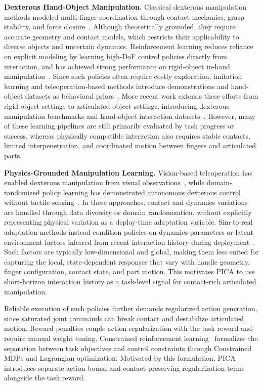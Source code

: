 \documentclass{llmxive}
\begin{document}
\textbf{Dexterous Hand-Object Manipulation.}
Classical dexterous manipulation methods modeled multi-finger coordination through contact mechanics, grasp stability, and force closure~\cite{bicchi1995closure,okamura2000overview}. Although theoretically grounded, they require accurate geometry and contact models, which restricts their applicability to diverse objects and uncertain dynamics. Reinforcement learning reduces reliance on explicit modeling by learning high-DoF control policies directly from interaction, and has achieved strong performance on rigid-object in-hand manipulation~\cite{andrychowicz2020learning,rajeswaran2018learning,chen2021system}. Since such policies often require costly exploration, imitation learning and teleoperation-based methods introduce demonstrations and hand-object datasets as behavioral priors~\cite{qin2022dexmv,yang2022oakink,qin2023anyteleop,liu2022hoi4d}. More recent work extends these efforts from rigid-object settings to articulated-object settings, introducing dexterous manipulation benchmarks and hand-object interaction datasets~\cite{bao2023dexart,fan2023arctic}. However, many of these learning pipelines are still primarily evaluated by task progress or success, whereas physically compatible interaction also requires stable contacts, limited interpenetration, and coordinated motion between fingers and articulated parts.

\textbf{Physics-Grounded Manipulation Learning.}
Vision-based teleoperation has enabled dexterous manipulation from visual observations~\cite{handa2020dexpilot,qin2022onehand}, while domain-randomized policy learning has demonstrated autonomous dexterous control without tactile sensing~\cite{andrychowicz2020learning}. In these approaches, contact and dynamics variations are handled through data diversity or domain randomization, without explicitly representing physical variation as a deploy-time adaptation variable. Sim-to-real adaptation methods instead condition policies on dynamics parameters or latent environment factors inferred from recent interaction history during deployment~\cite{yu2017preparing,kumar2021rma}. Such factors are typically low-dimensional and global, making them less suited for capturing the local, state-dependent responses that vary with handle geometry, finger configuration, contact state, and part motion. This motivates PICA to use short-horizon interaction history as a task-level signal for contact-rich articulated manipulation.

Reliable execution of such policies further demands regularized action generation, since saturated joint commands can break contact and destabilize articulated motion. Reward penalties couple action regularization with the task reward and require manual weight tuning. Constrained reinforcement learning~\cite{achiam2017constrained,tessler2019reward} formalizes the separation between task objectives and control constraints through Constrained MDPs and Lagrangian optimization. Motivated by this formulation, PICA introduces separate action-bound and contact-preserving regularization terms alongside the task reward.
\end{document}
